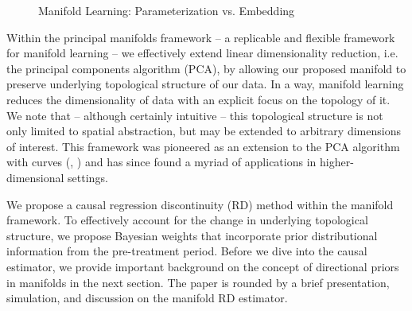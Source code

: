 \documentclass[twoside,11pt]{article}
\begin{document}
\begin{figure}[h!]
\begin{center}
  \end{center}
  \caption{Manifold Learning: Parameterization vs. Embedding}\label{fig:manifolds}
\end{figure}

Within the principal manifolds framework \citep{Meng2021} -- a replicable and flexible framework for manifold learning -- we effectively extend linear dimensionality reduction, i.e. the principal components algorithm (PCA), by allowing our proposed manifold to preserve underlying topological structure of our data. In a way, manifold learning reduces the dimensionality of data with an explicit focus on the topology of it. We note that -- although certainly intuitive -- this topological structure is not only limited to spatial abstraction, but may be extended to arbitrary dimensions of interest. This framework was pioneered as an extension to the PCA algorithm with curves (\citet{HastieStuetzle1989}, \citet{Tibshirani1992}) and has since found a myriad of applications in higher-dimensional settings. 

We propose a causal regression discontinuity (RD) method within the manifold framework. To effectively account for the change in underlying topological structure, we propose Bayesian weights that incorporate prior distributional information from the pre-treatment period. Before we dive into the causal estimator, we provide important background on the concept of directional priors in manifolds in the next section. The paper is rounded by a brief presentation, simulation, and discussion on the manifold RD estimator.   
\end{document}

